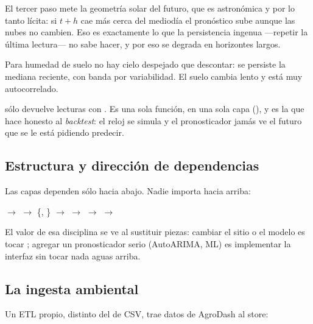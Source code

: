 El tercer paso mete la geometría solar del futuro, que es astronómica y por lo tanto
lícita: si $t+h$ cae más cerca del mediodía el pronóstico sube aunque las nubes no
cambien. Eso es exactamente lo que la persistencia ingenua ---repetir la última lectura---
no sabe hacer, y por eso se degrada en horizontes largos.

Para humedad de suelo no hay cielo despejado que descontar: se persiste la mediana
reciente, con banda por variabilidad. El suelo cambia lento y está muy autocorrelado.

\begin{aviso}[title=Barrera anti-fuga]
 sólo devuelve lecturas con .
Es una sola función, en una sola capa (), y es la que hace honesto al
\emph{backtest}: el reloj se simula y el pronosticador jamás ve el futuro que se le está
pidiendo predecir.
\end{aviso}

\subsection{Estructura y dirección de dependencias}

Las capas dependen sólo hacia abajo. Nadie importa hacia arriba:

\begin{center}
 $\to$  $\to$ \{, \} $\to$
 $\to$  $\to$  $\to$ 
\end{center}

El valor de esa disciplina se ve al sustituir piezas: cambiar el sitio o el modelo es
tocar ; agregar un pronosticador serio (AutoARIMA, ML) es implementar la
interfaz  sin tocar nada aguas arriba.

\subsection{La ingesta ambiental}

Un ETL propio, distinto del de CSV, trae datos de AgroDash al store:


